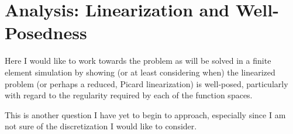 \section{Analysis: Linearization and Well-Posedness}\label{cha:analysis}
    \begin{remark}
        Here I would like to work towards the problem as will be solved in a finite element simulation by showing (or at least considering when) the linearized problem (or perhaps a reduced, Picard linearization) is well-posed, particularly with regard to the regularity required by each of the function spaces.
        
        This is another question I have yet to begin to approach, especially since I am not sure of the discretization I would like to consider.
    \end{remark}
